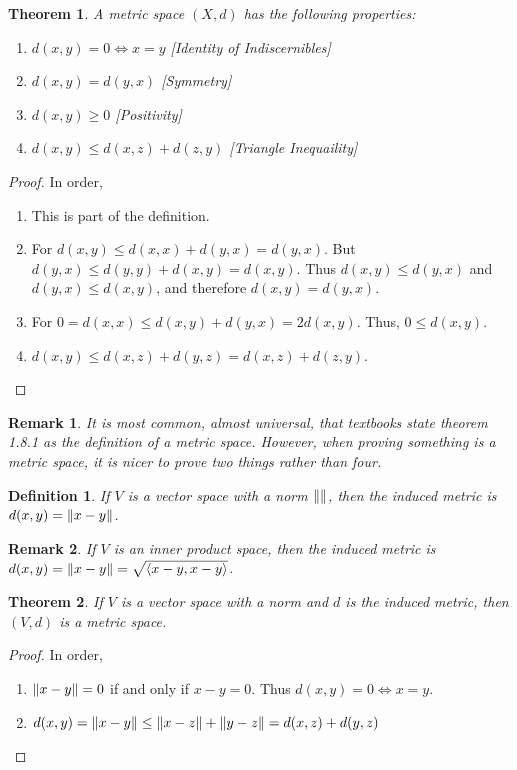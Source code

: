 \documentclass[oneside]{book}
\theoremstyle{mystyle}
\newtheorem{theorem}{Theorem}[section]
\newtheorem{definition}{Definition}[section]
\newtheorem{remark}{Remark}[section]
\DeclarePairedDelimiter\norm{\lVert}{\rVert}
\begin{document}
\begin{theorem}
A metric space $(X,d)$ has the following properties:
\begin{enumerate}
\item $d(x,y) = 0 \Leftrightarrow x=y$ \hfill [Identity of Indiscernibles]
\item $d(x,y) = d(y,x)$ \hfill [Symmetry]
\item $d(x,y) \geq 0$ \hfill [Positivity]
\item $d(x,y) \leq d(x,z)+d(z,y)$ \hfill [Triangle Inequaility]
\end{enumerate}
\end{theorem}
\begin{proof}
In order,
\begin{enumerate}
\item This is part of the definition.
\item For $d(x,y) \leq d(x,x)+d(y,x) = d(y,x)$. But $d(y,x) \leq d(y,y)+d(x,y) = d(x,y)$. Thus $d(x,y)\leq d(y,x)$ and $d(y,x) \leq d(x,y)$, and therefore $d(x,y) = d(y,x)$.
\item For $0=d(x,x) \leq d(x,y)+d(y,x) = 2d(x,y)$. Thus, $0\leq d(x,y)$.
\item $d(x,y)\leq d(x,z)+d(y,z) = d(x,z)+d(z,y)$.
\end{enumerate}
\end{proof}

\begin{remark}
It is most common, almost universal, that textbooks state theorem 1.8.1 as the definition of a metric space. However, when proving something is a metric space, it is nicer to prove two things rather than four.
\end{remark}

\begin{definition}
If $V$ is a vector space with a norm $\norm{}$, then the induced metric is $d(x,y) = \norm{x-y}$.
\end{definition}

\begin{remark}
If $V$ is an inner product space, then the induced metric is $d(x,y) = \norm{x-y} = \sqrt{\langle x-y,x-y\rangle }$.
\end{remark}

\begin{theorem}
If $V$ is a vector space with a norm and $d$ is the induced metric, then $(V,d)$ is a metric space.
\end{theorem}
\begin{proof}
In order,
\begin{enumerate}
\item $\norm{x-y} = 0$ if and only if $x-y = 0$. Thus $d(x,y) = 0 \Leftrightarrow x=y$.
\item $d(x,y) = \norm{x-y}\leq \norm{x-z}+\norm{y-z} = d(x,z)+d(y,z)$
\end{enumerate}
\end{proof}
\end{document}
